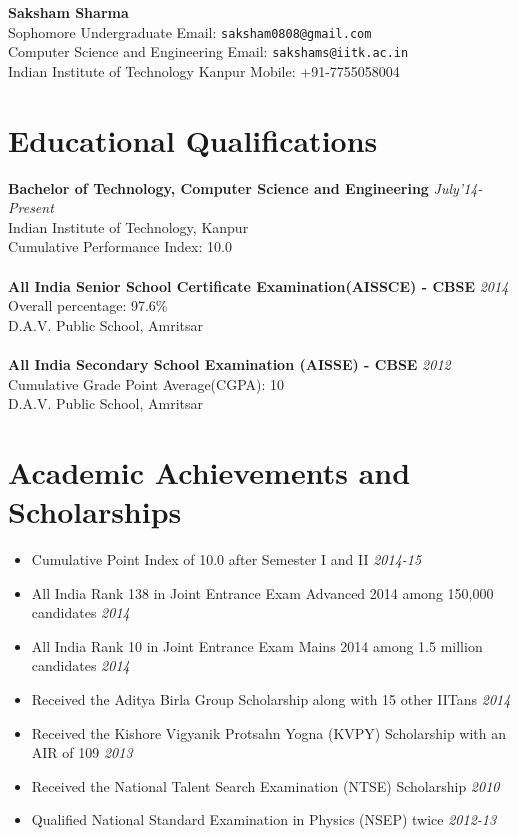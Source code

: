 \documentclass[11pt,a4paper]{article}
\begin{document}
\textbf{\huge{Saksham Sharma}}\\	%
Sophomore Undergraduate    \hfill Email: \texttt{saksham0808@gmail.com}\\
Computer Science and Engineering      \hfill  Email: \texttt{sakshams@iitk.ac.in}\\
Indian Institute of Technology Kanpur	\hfill Mobile: {+91-7755058004}\\


\section*{Educational Qualifications}
\textbf{\large{Bachelor of Technology, Computer Science and Engineering}} \hfill\textit{ July'14-Present}\\
Indian Institute of Technology, Kanpur\\
Cumulative Performance Index: 10.0\\
\\
\textbf{\large{All India Senior School Certificate Examination(AISSCE) - CBSE}} \hfill\textit{ 2014}\\
Overall percentage: 97.6\%\\
D.A.V. Public School, Amritsar\\
\\
\textbf{\large{All India Secondary School Examination (AISSE) - CBSE}} \hfill\textit{ 2012}\\
Cumulative Grade Point Average(CGPA): 10\\
D.A.V. Public School, Amritsar


\section*{Academic Achievements and Scholarships}
\begin {itemize}
\item Cumulative Point Index of 10.0 after Semester I and II                                        \hfill \textit{2014-15}
\item All India Rank 138 in Joint Entrance Exam Advanced 2014 among 150,000 candidates            	\hfill \textit{2014}
\item All India Rank 10 in Joint Entrance Exam Mains 2014 among 1.5 million candidates              \hfill \textit{2014}
\item Received the Aditya Birla Group Scholarship along with 15 other IITans                        \hfill \textit{2014}
\item Received the Kishore Vigyanik Protsahn Yogna (KVPY) Scholarship with an AIR of 109            \hfill \textit{2013}
\item Received the National Talent Search Examination (NTSE) Scholarship                            \hfill \textit{2010}
\item Qualified National Standard Examination in Physics (NSEP) twice                               \hfill \textit{2012-13}
\end{itemize}
\end{document}
